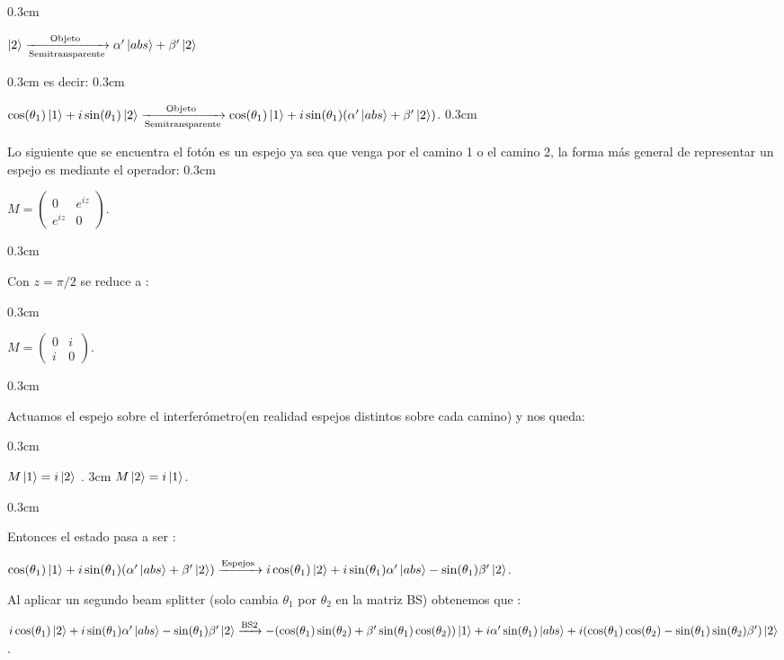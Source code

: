 \documentclass[11pt]{article}
\begin{document}
\vspace
{0.3cm}

$
\ket{2}\xrightarrow[\text{Semitransparente}]{\text{Objeto }}\alpha
' \ket{abs} +\beta' \ket{2} $

\vspace
{0.3cm}
es decir:
\vspace
{0.3cm}

$\cos(\theta_{1})\ket{1}+i\sin(\theta_{1})\ket{2}\xrightarrow[\text{Semitransparente}]{\text{Objeto }}\cos
(\theta_
{1})\ket
{1}+i\sin(\theta_
{1})(\alpha
' \ket
{abs
} +\beta' \ket
{2} )
$.
\vspace
{0.3cm}

Lo siguiente que se encuentra el fotón es un espejo ya sea que venga por el camino 1 o el camino 2, la forma más general de representar un espejo es mediante el operador:
\vspace
{0.3cm}

$M
=\begin
{pmatrix} 0& e^
{i z} \\ e^
{iz
} & 0 \end
{pmatrix}$.

\vspace
{0.3cm}

Con $z
=\pi/2$ se reduce a :

\vspace
{0.3cm}

$M
=\begin
{pmatrix} 0& i\\ i & 0 \end
{pmatrix}$.

\vspace
{0.3cm}

Actuamos el espejo sobre el interferómetro(en realidad espejos distintos sobre cada camino) y nos queda:

\vspace
{0.3cm}

$M
 \ket
{1}=i\ket
{2}$ .  
\hspace
{3cm}   
$M
\ket
{2}=i\ket
{1}$.

\vspace
{0.3cm}

Entonces el estado pasa a ser  :

\vspace{0.3cm}

$\cos
(\theta_
{1})\ket
{1}+i\sin(\theta_
{1})(\alpha
' \ket
{abs
} +\beta' \ket
{2} )\xrightarrow{\text{Espejos }}i\cos(\theta_{1})\ket{2}+i \sin(\theta_{1})\alpha'\ket{abs}-\sin(\theta_{1})\beta'\ket{2}$.

\vspace{0.3cm}

Al aplicar un segundo beam splitter
(solo cambia $\theta_
{1} $ por $ \theta_
{2} $ en la matriz BS) obtenemos que :


$i\cos(\theta_{1})\ket{2}+i \sin(\theta_{1})\alpha'\ket{abs}-\sin(\theta_{1})\beta'\ket{2}\xrightarrow{\text{BS2}}-
(\cos
(\theta_
{1})\sin(\theta_
{2})+\beta' \sin(\theta_
{1})\cos
(\theta_
{2}))\ket
{1}+i \alpha
' \sin(\theta_
{1})\ket
{abs
}+i(\cos
(\theta_
{1})\cos
(\theta_
{2})-\sin(\theta_
{1})\sin(\theta_
{2})\beta')\ket
{2}$.
\end{document}
